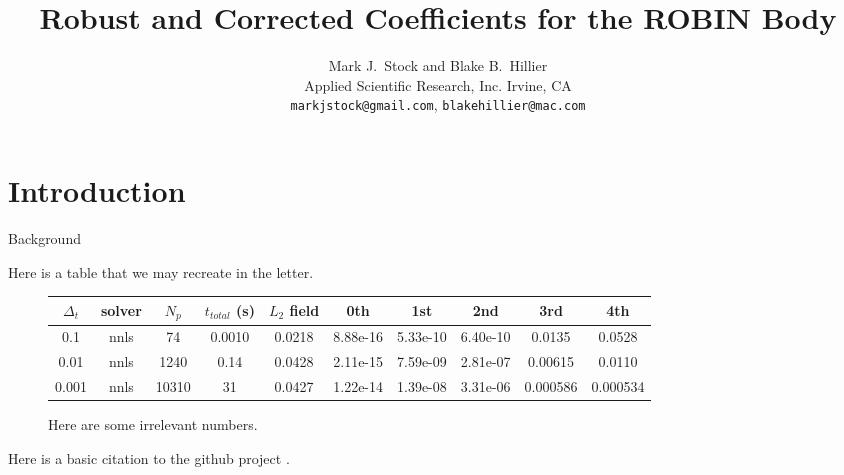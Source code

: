 \documentclass[12pt]{article}
\title{Robust and Corrected Coefficients for the ROBIN Body}
\author{Mark J.~Stock and Blake B.~Hillier\\
        Applied Scientific Research, Inc.
        Irvine, CA\\
        \texttt{markjstock@gmail.com}, \texttt{blakehillier@mac.com}
}
\begin{document}
\maketitle



\section{Introduction}
Background

Here is a table that we may recreate in the letter.

\begin{figure} \begin{centering}
\begin{small}
\begin{tabular}{cccccccccc}
$\Delta_t$ & solver & $N_p$ & $t_{total}$ (s) & $L_2$ field & 0th & 1st & 2nd & 3rd & 4th \\
\hline
0.1 & nnls & 74 & 0.0010 & 0.0218 & 8.88e-16 & 5.33e-10 & 6.40e-10 & 0.0135 & 0.0528 \\
\hline
0.01 & nnls & 1240 & 0.14 & 0.0428 & 2.11e-15 & 7.59e-09 & 2.81e-07 & 0.00615 & 0.0110 \\
\hline
0.001 & nnls & 10310 & 31 & 0.0427 & 1.22e-14 & 1.39e-08 & 3.31e-06 & 0.000586 & 0.000534 \\
\end{tabular}
\caption{Here are some irrelevant numbers. }
\label{solverres}
\end{small}
\end{centering}\end{figure}%

Here is a basic citation to the github project \cite{robinsurfmesh}.




\end{document}
